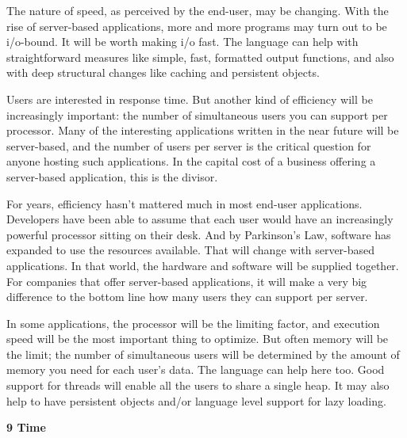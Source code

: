The nature of speed, as perceived by the
                  end-user, may be changing. With the rise of server-based
                  applications, more and more programs may turn out to be
                  i/o-bound. It will be worth making i/o fast. The language can
                  help with straightforward measures like simple, fast,
                  formatted output functions, and also with deep structural
                  changes like caching and persistent objects.

Users
                  are interested in response time. But another kind of
                  efficiency will be increasingly important: the number of
                  simultaneous users you can support per processor. Many of the
                  interesting applications written in the near future will be
                  server-based, and the number of users per server is the
                  critical question for anyone hosting such applications. In the
                  capital cost of a business offering a server-based
                  application, this is the divisor.

For years,
                  efficiency hasn't mattered much in most end-user applications.
                  Developers have been able to assume that each user would have
                  an increasingly powerful processor sitting on their desk. And
                  by Parkinson's Law, software has expanded to use the resources
                  available. That will change with server-based applications. In
                  that world, the hardware and software will be supplied
                  together. For companies that offer server-based applications,
                  it will make a very big difference to the bottom line how many
                  users they can support per server.

In some
                  applications, the processor will be the limiting factor, and
                  execution speed will be the most important thing to optimize.
                  But often memory will be the limit; the number of simultaneous
                  users will be determined by the amount of memory you need for
                  each user's data. The language can help here too. Good support
                  for threads will enable all the users to share a single heap.
                  It may also help to have persistent objects and/or language
                  level support for lazy loading.

\textbf{9 Time}

